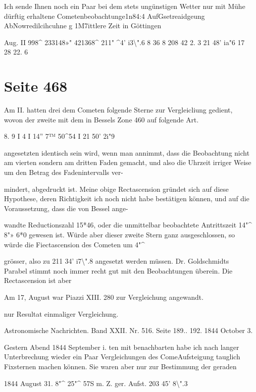 \documentclass[10pt,a4paper]{article}
\begin{document}
Ich sende Ihnen noch ein Paar bei dem stets ungünstigen Wetter nur mit Mühe dürftig erhaltene Cometenbeobachtunge1n84:4 AufGsetreaidgeung AbNowredilcihcuhne g 1M7ittlere Zeit in Göttingen

Aug. II 998\textasciicircum{} 233148»" 421368\textasciicircum{} 211" \textasciicircum{}4' i3\textbackslash{}".6 8 36 8 208 42 2. 3 21\textdegree{} 48' ia"6 17 28 22. 6


\newpage
\section*{Seite 468}
Am II. hatten drei dem Cometen folgende Sterne zur Vergleicliung gedient, wovon der zweite mit dem in Bessels Zone 460 auf folgende Art.

8. 9 I 4 I 14'' 7™ 50\textasciicircum{}54 I 21\textdegree{} 50' 2i"9

angesetzten identisch sein wird, wenn man annimmt, dass die Beobachtung nicht am vierten sondern am dritten Faden gemacht, und also die Uhrzeit irriger Weise um den Betrag des Fadenintervalls ver-

mindert, abgedruckt ist. Meine obige Rectascension gründet sich auf diese Hypothese, deren Richtigkeit ich noch nicht habe bestätigen können, und auf die Voraussetzung, dass die von Bessel ange-

wandte Reductionszahl 15*46, oder die unmittelbar beobachtete Antrittszeit 14"\textasciicircum{} 8"» 6*0 gewesen ist. Würde aber dieser zweite Stern ganz ausgeschlossen, so würde die Fiectascension des Cometen um 4"\textasciicircum{}

grösser, also zu 211\textdegree{} 34' i7\textbackslash{}".8 angesetzt werden müssen. Dr. Goldschmidts Parabel stimmt noch immer recht gut mit den Beobachtungen überein. Die Rectascension ist aber

Am 17, August war Piazzi XIII. 280 zur Vergleichung angewandt.

nur Resultat einmaliger Vergleichung.

Astronomische Nachrichten. Band XXII. Nr. 516. Seite 189.. 192. 1844 October 3.

Gestern Abend 1844 September i. ten mit benachbarten habe ich nach langer Unterbrechung wieder ein Paar Vergleichungen des ComeAufsteigung tauglich Fixsternen machen können. Sie waren aber nur zur Bestimmung der geraden

1844 August 31. 8"\textasciicircum{} 25"\textasciicircum{} 57S m. Z. ger. Aufst. 203\textdegree{} 45' 8\textbackslash{}".3
\end{document}
